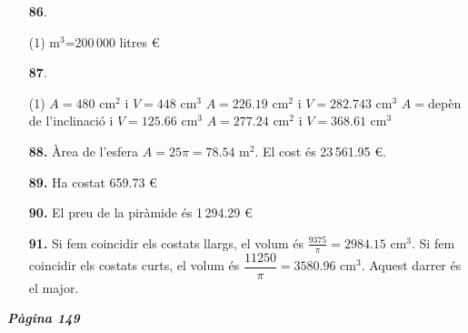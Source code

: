 \documentclass[a4paper, pdf, twoside]{book}
\begin{document}
\begin{multicols}{2}
\begin{enumerate}

 \item[\fontfamily{phv}\selectfont\color{blue}\textbf{86}. ] 
 \begin{tasks}[column-sep=1em, item-indent=1.3333em](1)
	  m$^3$=200\,000 litres
	  \euro {} 
\end{tasks}
\vspace{0.25cm}



 \item[\fontfamily{phv}\selectfont\color{blue}\textbf{87}. ]  \scalebox{0.6}{\simbolclau } 
 \begin{tasks}[column-sep=1em, item-indent=1.3333em](1)
	 \task* $A=480$ cm$^2$ i $V=448$ cm$^3$
	 \task* $A=226.19$ cm$^2$ i $V=282.743$ cm$^3$
	 \task* $A=$depèn de l'inclinació i $V=125.66$ cm$^3$
	 \task* $A=277.24$ cm$^2$ i $V=368.61$ cm$^3$
\end{tasks}
\vspace{0.25cm}
\item[\fontfamily{phv}\selectfont\color{blue}\textbf{88. }] 
Àrea de l'esfera $A=25\pi =78.54$ m$^2$. El cost és 23\,561.95 \euro {}.
\vspace{0.25cm}
\item[\fontfamily{phv}\selectfont\color{blue}\textbf{89. }] 
Ha costat 659.73 \euro {}
\vspace{0.25cm}
\item[\fontfamily{phv}\selectfont\color{blue}\textbf{90. }] 
El preu de la piràmide és 1\,294.29 \euro {}
\vspace{0.25cm}
\item[\fontfamily{phv}\selectfont\color{blue}\textbf{91. }] 
 Si fem coincidir els costats llargs, el volum és $\frac {9375}{\pi }=2984.15$ cm$^3$. Si fem coincidir els costats curts, el volum és $\dfrac {11250}{\pi }=3580.96$ cm$^3$. Aquest darrer és el major.
 \end{enumerate}
\vspace{0.3cm}


{\textbf{\em Pàgina 149}} \hrulefill
\begin{enumerate}
\vspace{0.25cm}




\end{enumerate}
\end{multicols}
\end{document}
